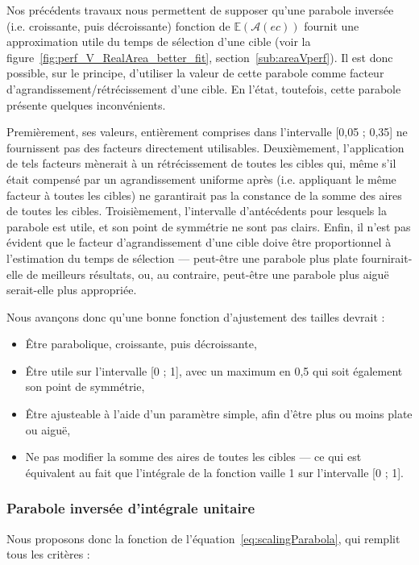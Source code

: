 	Nos précédents travaux nous permettent de supposer qu'une parabole \og inversée \fg{} (i.e. croissante, puis décroissante) fonction de $\mathbb{E}(\mathcal{A}(ec))$ fournit une approximation utile du temps de sélection d'une cible (voir la figure~\ref{fig:perf_V_RealArea_better_fit}, section~\ref{sub:areaVperf}). Il est donc possible, sur le principe, d'utiliser la valeur de cette parabole comme facteur d'agrandissement/rétrécissement d'une cible. En l'état, toutefois, cette parabole présente quelques inconvénients.
	
	Premièrement, ses valeurs, entièrement comprises dans l'intervalle [0,05 ; 0,35] ne fournissent pas des facteurs directement utilisables. Deuxièmement, l'application de tels facteurs mènerait à un rétrécissement de toutes les cibles qui, même s'il était compensé par un agrandissement uniforme après (i.e. appliquant le même facteur à toutes les cibles) ne garantirait pas la constance de la somme des aires de toutes les cibles. Troisièmement, l'intervalle d'antécédents pour lesquels la parabole est utile, et son point de symmétrie ne sont pas clairs. Enfin, il n'est pas évident que le facteur d'agrandissement d'une cible doive être proportionnel à l'estimation du temps de sélection --- peut-être une parabole plus \og plate \fg{} fournirait-elle de meilleurs résultats, ou, au contraire, peut-être une parabole plus \og aiguë \fg{} serait-elle plus appropriée.
	
	Nous avançons donc qu'une bonne fonction d'ajustement des tailles devrait :
	
	\begin{itemize}
		\item Être parabolique, croissante, puis décroissante,
		\item Être utile sur l'intervalle [0 ; 1], avec un maximum en 0,5 qui soit également son point de symmétrie,
		\item Être ajusteable à l'aide d'un paramètre simple, afin d'être plus ou moins plate ou aiguë,
		\item Ne pas modifier la somme des aires de toutes les cibles --- ce qui est équivalent au fait que l'intégrale de la fonction vaille 1 sur l'intervalle [0 ; 1].
	\end{itemize}
	
	\subsubsection{Parabole inversée d'intégrale unitaire}
	Nous proposons donc la fonction de l'équation~\ref{eq:scalingParabola}, qui remplit tous les critères :
	
